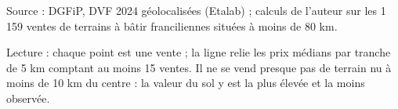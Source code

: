 Source : DGFiP, DVF 2024 géolocalisées (Etalab) ; calculs de l'auteur sur les 1 159 ventes de terrains à bâtir franciliennes situées à moins de 80 km.\par Lecture : chaque point est une vente ; la ligne relie les prix médians par tranche de 5 km comptant au moins 15 ventes. Il ne se vend presque pas de terrain nu à moins de 10 km du centre : la valeur du sol y est la plus élevée et la moins observée.
